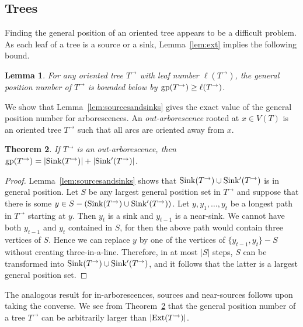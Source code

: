\documentclass[a4paper,12pt]{article}
\newtheorem{theorem}{Theorem}[section]
\newtheorem{lemma}[theorem]{Lemma}
\theoremstyle{definition}
\newcommand{\sink }{{\rm Sink}}
\newcommand{\nsink }{{\rm Sink'}}
\newcommand{\gp}{{\rm gp}}
\newcommand{\ext}{{\rm Ext}}
\begin{document}
	\subsection{Trees}\label{subsec:trees}
	
	Finding the general position of an oriented tree appears to be a difficult problem. As each leaf of a tree is a source or a sink, Lemma~\ref{lem:ext} implies the following bound.  
	
	\begin{lemma}\label{lem:leaf bound}
		For any oriented tree $T^{\rightarrow }$ with leaf number $\ell (T^{\rightarrow })$, the general position number of $T^{\rightarrow }$ is bounded below by $\gp (T^{\rightarrow }) \geq \ell (T^{\rightarrow })$.
	\end{lemma}
	
	We show that Lemma~\ref{lem:sourcesandsinks} gives the exact value of the general position number for arborescences. An \emph{out-arborescence} rooted at $x \in V(T)$ is an oriented tree $T^{\rightarrow }$ such that all arcs are oriented away from $x$. 
	
	\begin{theorem}\label{thm:arborescence}
		If $T^{\rightarrow }$ is an out-arborescence, then $\gp (T^{\rightarrow }) = |\sink (T^{\rightarrow })|+|\nsink (T^{\rightarrow })|$.
	\end{theorem}
	\begin{proof}
		Lemma~\ref{lem:sourcesandsinks} shows that $\sink (T^{\rightarrow }) \cup \nsink (T^{\rightarrow })$ is in general position. Let $S$ be any largest general position set in $T^{\rightarrow }$ and suppose that there is some $y \in S - (\sink (T^{\rightarrow }) \cup \nsink (T^{\rightarrow }))$. Let $y,y_1,\dots ,y_t$ be a longest path in $T^{\rightarrow }$ starting at $y$. Then $y_t$ is a sink and $y_{t-1}$ is a near-sink. We cannot have both $y_{t-1}$ and $y_t$ contained in $S$, for then the above path would contain three vertices of $S$. Hence we can replace $y$ by one of the vertices of $\{ y_{t-1},y_t\} -S$ without creating three-in-a-line. Therefore, in at most $|S|$ steps, $S$ can be transformed into $\sink (T^{\rightarrow }) \cup \nsink (T^{\rightarrow })$, and it follows that the latter is a largest general position set.
	\end{proof}
	The analogous result for in-arborescences, sources and near-sources follows upon taking the converse.  We see from Theorem~\ref{thm:arborescence} that the general position number of a tree $T^{\rightarrow }$ can be arbitrarily larger than $|\ext(T^{\rightarrow })|$. 
	
\end{document}
